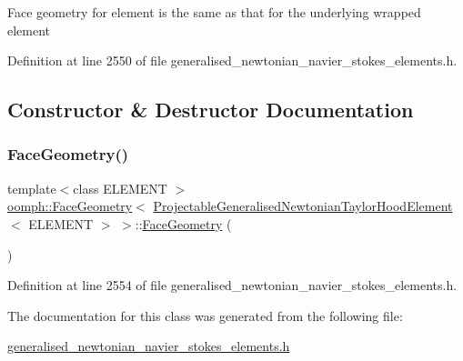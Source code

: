 Face geometry for element is the same as that for the underlying wrapped element 

Definition at line 2550 of file generalised\+\_\+newtonian\+\_\+navier\+\_\+stokes\+\_\+elements.\+h.



\subsection{Constructor \& Destructor Documentation}
\mbox{\label{classoomph_1_1FaceGeometry_3_01ProjectableGeneralisedNewtonianTaylorHoodElement_3_01ELEMENT_01_4_01_4_a376f226a24d93c705b0a5bffbd77cd12}} 
\subsubsection{\texorpdfstring{Face\+Geometry()}{FaceGeometry()}}
{\footnotesize\ttfamily template$<$class E\+L\+E\+M\+E\+NT $>$ \\
\hyperlink{classoomph_1_1FaceGeometry}{oomph\+::\+Face\+Geometry}$<$ \hyperlink{classoomph_1_1ProjectableGeneralisedNewtonianTaylorHoodElement}{Projectable\+Generalised\+Newtonian\+Taylor\+Hood\+Element}$<$ E\+L\+E\+M\+E\+NT $>$ $>$\+::\hyperlink{classoomph_1_1FaceGeometry}{Face\+Geometry} (\begin{DoxyParamCaption}{ }\end{DoxyParamCaption})\hspace{0.3cm}{\ttfamily [inline]}}



Definition at line 2554 of file generalised\+\_\+newtonian\+\_\+navier\+\_\+stokes\+\_\+elements.\+h.



The documentation for this class was generated from the following file\+:\begin{DoxyCompactItemize}
\item 
\hyperlink{generalised__newtonian__navier__stokes__elements_8h}{generalised\+\_\+newtonian\+\_\+navier\+\_\+stokes\+\_\+elements.\+h}\end{DoxyCompactItemize}
